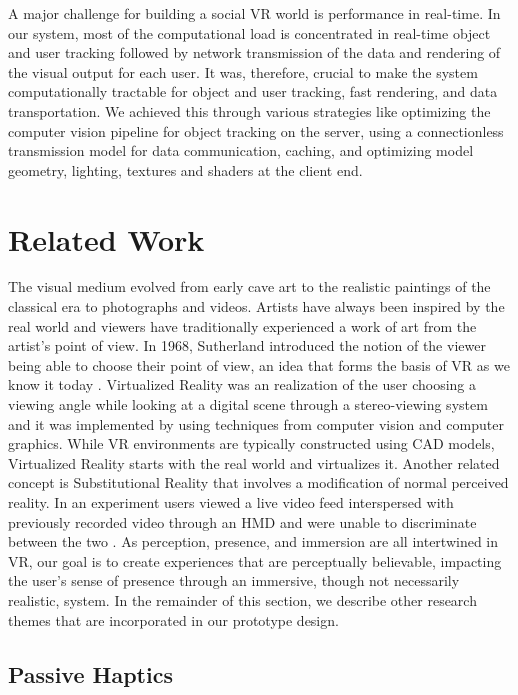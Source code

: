 \documentclass{sigchi}
\begin{document}
A major challenge for building a social VR world is performance in real-time. In our system, most of the computational load is concentrated in real-time object and user tracking followed by network transmission of the data and rendering of the visual output for each user. It was, therefore, crucial to make the system computationally tractable for object and user tracking, fast rendering, and data transportation. We achieved this through various strategies like optimizing the computer vision pipeline for object tracking on the server, using a connectionless transmission model for data communication, caching, and optimizing model geometry, lighting, textures and shaders at the client end. 



\section{Related Work}

The visual medium evolved from early cave art to the realistic paintings of the classical era to photographs and videos. Artists have always been inspired by the real world and viewers have traditionally experienced a work of art from the artist's point of view. In 1968, Sutherland introduced the notion of the viewer being able to choose their point of view, an idea that forms the basis of VR as we know it today  \cite{sutherland1965ultimate}. Virtualized Reality \cite{kanade1995virtualized} was an realization of the user choosing a viewing angle while looking at a digital scene through a stereo-viewing system and it was implemented by using techniques from computer vision and computer graphics. While VR environments are typically constructed using CAD models, Virtualized Reality starts with the real world and virtualizes it. Another related concept is Substitutional Reality that involves a modification of normal perceived reality. In an experiment users viewed a live video feed interspersed with previously recorded video through an HMD and were unable to discriminate between the two \cite{suzuki2012substitutional}. As perception, presence, and immersion are all intertwined in VR, our goal is to create experiences that are perceptually believable, impacting the user's sense of presence through an immersive, though not necessarily realistic, system. In the remainder of this section, we describe other research themes that are incorporated in our prototype design. 

 

\subsection{Passive Haptics}
\end{document}
